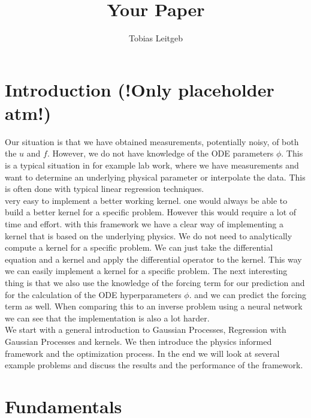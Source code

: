 \documentclass{article}
\title{Your Paper}
\author{Tobias Leitgeb}
\begin{document}
\maketitle
\newpage
\tableofcontents

\newpage
\begin{abstract}

\end{abstract}

\section{Introduction (!Only placeholder atm!)}
Our situation is that we have obtained measurements, potentially noisy, of both the $u$ and $f$. However, we do not have knowledge of the ODE parameters
$\phi$. This is a typical situation in for example lab work, where we have
measurements and want to determine an underlying physical parameter or
interpolate the data. This is often done with typical linear regression
techniques.\\ very easy to implement a better working kernel. one would always be able to build a better kernel for a specific problem. However this would require a lot of time and effort. with this framework we have a clear way of implementing a kernel that is based on the underlying physics. We do not need to analytically compute a kernel for a specific problem. We can just take the differential equation and a kernel and apply the differential operator to the kernel. This way we can easily implement a kernel for a specific problem. The next interesting thing is that we also use the knowledge of the forcing term for our prediction and for the calculation of the ODE hyperparameters $\phi$. and we can predict the forcing term as well. When comparing this to an inverse problem using a neural network we can see that the implementation is also a lot harder.\\
We start with a general introduction to Gaussian Processes, Regression with Gaussian Processes and kernels. We
then introduce the physics informed framework and the optimization process. In the end we will look at several example problems and discuss the results and the performance of the framework.\\

\section{Fundamentals}
\end{document}
